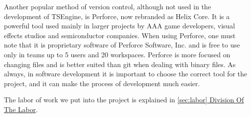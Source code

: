 Another popular method of version control, although not used in the development of TSEngine, is Perforce, now rebranded as Helix Core. It is a powerful tool used mainly in larger projects by AAA game developers, visual effects studios and semiconductor companies. When using Perforce, one must note that it is proprietary software of Perforce Software, Inc. and is free to use only in teams up to 5 users and 20 workspaces. Perforce is more focused on changing files and is better suited than git when dealing with binary files. As always, in software development it is important to choose the correct tool for the project, and it can make the process of development much easier.

The labor of work we put into the project is explained in \hyperref[]{\ref*{sec:labor} Division Of The Labor}.



